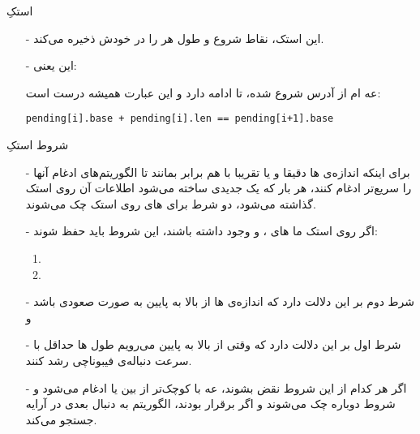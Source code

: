\begin{frame}{استکِ }
\begin{itemize}\itemr
\item[-]
این استک، نقاط شروع و طول هر  را در خودش ذخیره می‌کند.

\item[-]
این یعنی:

 عه
ام
از آدرس
شروع شده،
تا ادامه دارد و این عبارت همیشه درست است:
\begin{latin}
\begin{flushleft}
\texttt{pending[i].base + pending[i].len == pending[i+1].base}
\end{flushleft}
\end{latin}
\end{itemize}
\end{frame}

\begin{frame}{شروط استکِ }
\begin{itemize}\itemr
\item[-]
برای اینکه اندازه‌ی ها دقیقا و یا تقریبا با هم برابر بمانند تا الگوریتم‌های ادغام آنها را سریع‌تر ادغام کنند، هر بار که یک  جدیدی ساخته می‌شود اطلاعات آن روی استک گذاشته می‌شود، دو شرط برای های روی استک چک می‌شوند.

\item[-]
اگر روی استک ما 
های
،
 و
وجود داشته باشند، این شروط باید حفظ شوند:
\begin{enumerate}\itemr
\item 
{}
\item 
{}
\end{enumerate}
\item[-]
شرط دوم بر این دلالت دارد که اندازه‌ی 
ها
از بالا به پایین به صورت صعودی باشد و

\item[-]
شرط اول بر این دلالت دارد که وقتی از بالا به پایین می‌رویم طول ها حداقل با سرعت دنباله‌ی فیبوناچی رشد کنند.
\item[-]
اگر هر کدام از این شروط نقض بشوند، 
 عه
با  کوچک‌تر از بین 
یا 
ادغام می‌شود و شروط دوباره چک می‌شوند و اگر برقرار بودند، الگوریتم به دنبال 
بعدی در آرایه جستجو می‌کند.
\end{itemize}
\end{frame}

